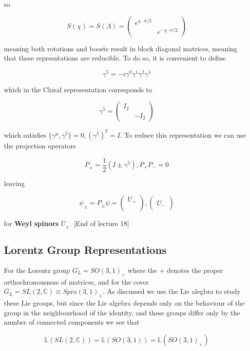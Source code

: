 \documentclass{article}
\theoremstyle{definition}
\begin{document}
so

$$ S(\chi) = S(\Lambda) =
\begin{pmatrix}
  e^{\chi \cdot \sigma / 2} & \\
  & e^{-\chi \cdot \sigma / 2}
\end{pmatrix} $$

meaning both rotations and boosts result in block diagonal matrices, meaning
that these represntations are reducible. To do so, it is convenient to define

$$ \gamma^5 = -i \gamma^0 \gamma^1 \gamma^2 \gamma^3 $$

which in the Chiral representation corresponds to

$$ \gamma^5 =
\begin{pmatrix}
  I_2 & \\
  & -I_2
\end{pmatrix} $$

which satisfies $\{\gamma^\mu, \gamma^5\} = 0, (\gamma^5)^2 = I$. To reduce this
representation we can use the projection operators

$$ P_\pm = \frac{1}{2} (I \pm \gamma^5), P_+ P_- = 0 $$

leaving

$$ \psi_\pm = P_\pm \psi =
\begin{pmatrix}
  U_+ \\ \\
\end{pmatrix},
\begin{pmatrix}
  \\ U_- \\
\end{pmatrix} $$

for \textbf{Weyl spinors} $U_\pm$. [End of lecture 18]

\subsection{Lorentz Group Representations}

For the Lorentz group $G_L = SO(3, 1)_+$ where the $+$ denotes the proper
orthochronousness of matrices, and for the cover $\overline{G}_L = SL(2,
\mathbb{C}) \equiv Spin(3, 1)_+$. As discussed we use the Lie alegbra to study
these Lie groups, but since the Lie algebra depends only on the behaviour of the
group in the neighbourhood of the identity, and these groups differ only by the
number of connected components we see that

$$ \mathbb{L}(SL(2, \mathbb{C})) = \mathbb{L}(SO(3, 1)) = \mathbb{L}(SO(3,
1)_+) $$
\end{document}

